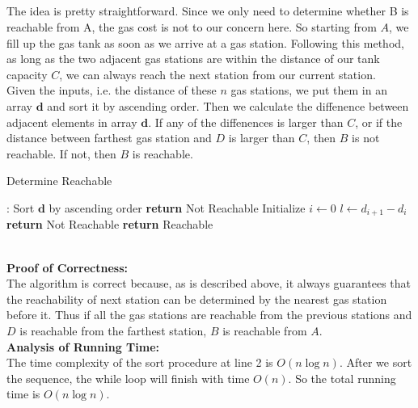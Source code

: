 \documentclass[12pt,letterpaper]{article}
\begin{document}
\subsection{}
The idea is pretty straightforward.
Since we only need to determine whether B is reachable from A, 
the gas cost is not to our concern here.
So starting from $A$, we fill up the gas tank as soon as we arrive at a gas station.
Following this method, as long as the two adjacent gas stations are within the distance of our tank capacity $C$,
we can always reach the next station from our current station. \\
Given the inputs, i.e. the distance of these $n$ gas stations, we put them in an array $\boldsymbol{d}$ and sort it by ascending order.
Then we calculate the diffenence between adjacent elements in array $\boldsymbol{d}$.
If any of the diffenences is larger than $C$, 
or if the distance between farthest gas station and $D$ is larger than $C$, then $B$ is not reachable.
If not, then $B$ is reachable.  
\begin{algorithm}
  \caption{Determine Reachable}\label{alg:deterreach}
  \begin{algorithmic}[1]
  :
  \State Sort $\boldsymbol{d}$ by ascending order
  \State \textbf{return} Not Reachable
  \EndIf
  \State Initialize $i\gets 0$
  \State $l\gets d_{i+1}-d_i$
  \State \textbf{return} Not Reachable
  \EndIf
  \EndWhile
  \State \textbf{return} Reachable
  \EndProcedure
  \end{algorithmic}
\end{algorithm}\\
\textbf{Proof of Correctness:}\\
The algorithm is correct because, as is described above, 
it always guarantees that the reachability of next station can be determined by the nearest gas station before it.
Thus if all the gas stations are reachable from the previous stations and $D$ is reachable from the farthest station, 
$B$ is reachable from $A$.\\
\textbf{Analysis of Running Time:}\\
The time complexity of the sort procedure at line 2 is $O(n\log n)$.
After we sort the sequence, the while loop will finish with time $O(n)$.
So the total running time is $O(n\log n)$.

\newpage
\subsection{}
\end{document}
